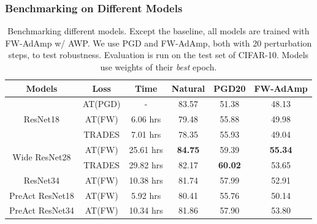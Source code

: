 \documentclass{article}
\begin{document}
        \subsubsection{Benchmarking on Different Models}\label{subs:DefenseModelBenchmarking}
            \begin{table}[h]
                \centering
                \begin{tabular}{cccccc}
                    \hline
                    Models                         & Loss                        & Time      & Natural        & PGD20          & FW-AdAmp             \\ \hline
                    \multirow{3}{*}{ResNet18}      & \multicolumn{1}{l}{AT(PGD)} & -         & 83.57          & 51.38          & 48.13          \\
                                                   & AT(FW)                      & 6.06 hrs  & 79.48          & 55.88          & 49.98          \\
                                                   & TRADES                      & 7.01 hrs  & 78.35          & 55.93          & 49.04          \\ \hline
                    \multirow{2}{*}{Wide ResNet28} & AT(FW)                      & 25.61 hrs & \textbf{84.75} & 59.39          & \textbf{55.34} \\
                                                   & TRADES                      & 29.82 hrs & 82.17          & \textbf{60.02} & 53.65          \\ \hline
                    ResNet34                       & AT(FW)                      & 10.38 hrs & 81.74          & 57.99          & 52.91          \\ \hline
                    PreAct ResNet18                & AT(FW)                      & 5.92 hrs  & 80.41          & 55.76          & 50.14          \\ \hline
                    PreAct ResNet34                & AT(FW)                      & 10.34 hrs & 81.86          & 57.90          & 53.80          \\ \hline
                \end{tabular}
                \caption{Benchmarking different models. Except the baseline, all models are trained with FW-AdAmp w/ AWP. We use PGD and FW-AdAmp, both with 20 perturbation steps, to test robustness. Evaluation is run on the test set of CIFAR-10. Models use weights of their \emph{best} epoch.}
                \label{table:DefenseBenchmarkingResults}
            \end{table}
\end{document}

